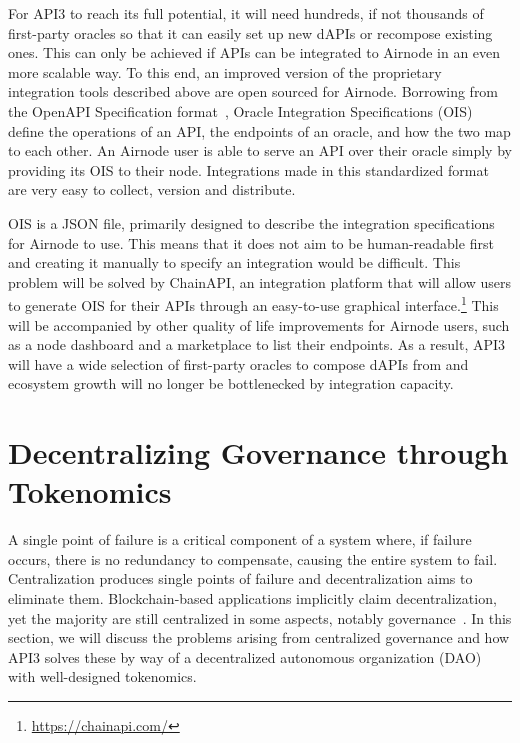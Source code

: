 \documentclass[11pt]{article}
\begin{document}
For API3 to reach its full potential, it will need hundreds, if not thousands of first-party oracles so that it can easily set up new dAPIs or recompose existing ones.
This can only be achieved if APIs can be integrated to Airnode in an even more scalable way.
To this end, an improved version of the proprietary integration tools described above are open sourced for Airnode.
Borrowing from the OpenAPI Specification format~\cite{oas}, Oracle Integration Specifications (OIS) define the operations of an API, the endpoints of an oracle, and how the two map to each other.
An Airnode user is able to serve an API over their oracle simply by providing its OIS to their node.
Integrations made in this standardized format are very easy to collect, version and distribute.

OIS is a JSON file, primarily designed to describe the integration specifications for Airnode to use.
This means that it does not aim to be human-readable first and creating it manually to specify an integration would be difficult.
This problem will be solved by ChainAPI, an integration platform that will allow users to generate OIS for their APIs through an easy-to-use graphical interface.\footnote{\url{https://chainapi.com/}}
This will be accompanied by other quality of life improvements for Airnode users, such as a node dashboard and a marketplace to list their endpoints.
As a result, API3 will have a wide selection of first-party oracles to compose dAPIs from and ecosystem growth will no longer be bottlenecked by integration capacity.

\section{Decentralizing Governance through Tokenomics}
\label{sec:decentralizing-governance-through-tokenomics}

A single point of failure is a critical component of a system where, if failure occurs, there is no redundancy to compensate, causing the entire system to fail.
Centralization produces single points of failure and decentralization aims to eliminate them.
Blockchain-based applications implicitly claim decentralization, yet the majority are still centralized in some aspects, notably governance~\cite{Walch:2019}.
In this section, we will discuss the problems arising from centralized governance and how API3 solves these by way of a decentralized autonomous organization (DAO)~\cite{buterin:2014b} with well-designed tokenomics.
\end{document}
